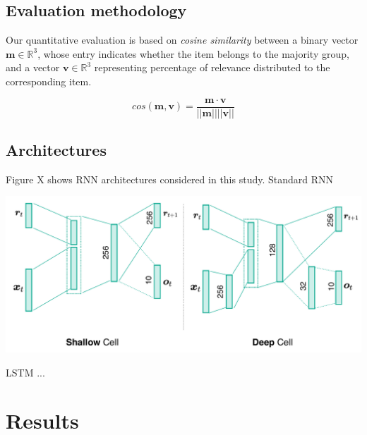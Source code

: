 \documentclass[a0,portrait]{a0poster}
\begin{document}
\begin{multicols}{2}
\subsection*{Evaluation methodology}
Our quantitative evaluation is based on \textit{cosine similarity} between a binary vector $\boldsymbol{m} \in \mathbb{R}^3$, whose entry indicates whether the item belongs to the majority group, and a vector $\boldsymbol{v} \in \mathbb{R}^3$ representing percentage of relevance distributed to the corresponding  item.

$$
cos(\boldsymbol{m}, \boldsymbol{v}) = \frac{ \boldsymbol{m} \cdot\boldsymbol{v} }{||\boldsymbol{m}||||\boldsymbol{v}||}
$$




\subsection*{Architectures}
Figure X shows RNN architectures considered in this study. Standard RNN

\begin{center}\vspace{0.5cm}
\includegraphics[width=0.7\linewidth]{architecture_with_number_neurons}
\end{center}\vspace{0.5cm}

LSTM ...


\section*{Results}


\end{multicols}
\end{document}
